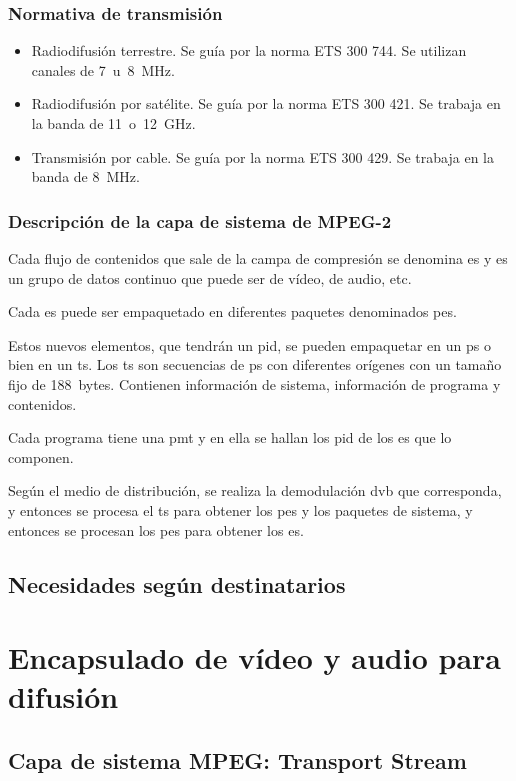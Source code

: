 \documentclass[10pt]{book}
\begin{document}
\subsection{Normativa de transmisión}

\begin{itemize}
  \item Radiodifusión terrestre. Se guía por la norma ETS 300 744. Se utilizan canales de \SI{7} u \SI{8}{\mega\Hz}.
  \item Radiodifusión por satélite. Se guía por la norma ETS 300 421. Se trabaja en la banda de \SI{11} o \SI{12}{\giga\Hz}.
  \item Transmisión por cable. Se guía por la norma ETS 300 429. Se trabaja en la banda de \SI{8}{\mega\Hz}.
\end{itemize}

\subsection{Descripción de la capa de sistema de MPEG-2}

Cada flujo de contenidos que sale de la campa de compresión se denomina \ac{es} y es un grupo de datos continuo que puede ser de vídeo, de audio, etc.

Cada \ac{es} puede ser empaquetado en diferentes paquetes denominados \ac{pes}.

Estos nuevos elementos, que tendrán un \ac{pid}, se pueden empaquetar en un \ac{ps} o bien en un \ac{ts}. Los \ac{ts} son secuencias de \ac{ps} con diferentes orígenes con un tamaño fijo de \SI{188}{bytes}. Contienen información de sistema, información de programa y contenidos.

Cada programa tiene una \ac{pmt} y en ella se hallan los \ac{pid} de los \ac{es} que lo componen.

Según el medio de distribución, se realiza la demodulación \ac{dvb} que corresponda, y entonces se procesa el \ac{ts} para obtener los \ac{pes} y los paquetes de sistema, y entonces se procesan los \ac{pes} para obtener los \ac{es}.
\section{Necesidades según destinatarios}

\chapter{Encapsulado de vídeo y audio para difusión}
\section{Capa de sistema MPEG: Transport Stream}
\end{document}
